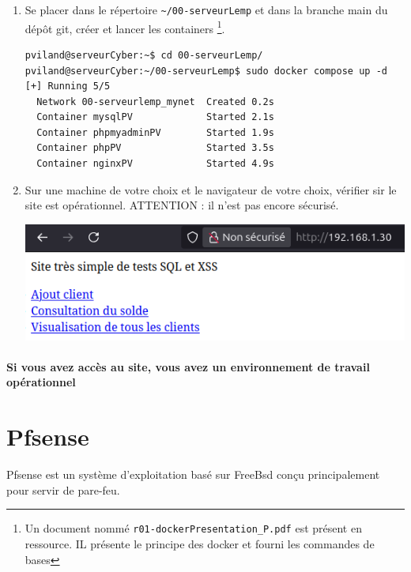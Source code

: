 \documentclass[french, 12pt]{article}%
\begin{document}
\begin{enumerate}[resume]


\item Se placer dans le répertoire \verb?~/00-serveurLemp? et dans la branche main du dépôt git, créer et lancer les containers \footnote{Un document nommé \texttt{r01-dockerPresentation\_P.pdf}  est présent en ressource. IL présente le principe des docker et fourni les commandes de bases }. 


\begin{lstlisting}[style=commande]
pviland@serveurCyber:~$ cd 00-serveurLemp/
pviland@serveurCyber:~/00-serveurLemp$ sudo docker compose up -d
[+] Running 5/5
  Network 00-serveurlemp_mynet  Created 0.2s
  Container mysqlPV             Started 2.1s
  Container phpmyadminPV        Started 1.9s
  Container phpPV               Started 3.5s
  Container nginxPV             Started 4.9s
\end{lstlisting}

\item Sur une machine de votre choix et le navigateur de votre choix, vérifier sir le site est opérationnel. ATTENTION : il n'est pas encore sécurisé.

\begin{center}
\includegraphics[scale=0.5]{./ressource/exServeurNonsecur.png}
\end{center}

\end{enumerate}

\paragraph{Si vous avez accès au site, vous avez un environnement de travail opérationnel}

\section{Pfsense}

Pfsense est un système d'exploitation basé sur FreeBsd conçu principalement pour servir de pare-feu. 
\end{document}
